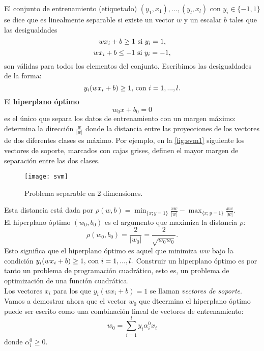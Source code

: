 El conjunto de entrenamiento (etiquetado) $(y_1,x_1),...,(y_l,x_l)$ con $y_i \in \lbrace -1,1 \rbrace$ se dice que es linealmente separable si existe un vector $w$ y un escalar $b$ tales que las desigualdades
\[ wx_i+b \geq 1 \textnormal{ si } y_i=1, \]
\[ wx_i+b \leq -1 \textnormal{ si } y_i=-1, \]
son válidas para todos los elementos del conjunto. Escribimos las desigualdades de la forma:
\[ y_i(wx_i+b) \geq 1 \textnormal{, con } i=1,...,l. \]
El \textbf{hiperplano óptimo} 
\[ w_0x+b_0=0 \]
es el único que separa los datos de entrenamiento con un margen máximo: determina la dirección $\frac{w}{\vert w \vert}$ donde la distancia entre las proyecciones de los vectores de dos diferentes clases es máximo. Por ejemplo, en la \autoref{fig:svm1} siguiente los vectores de soporte, marcados con cajas grises, definen el mayor margen de separación entre las dos clases.
\begin{figure}[H]
  \centering
  \texttt{[image: svm]}
  \caption{Problema separable en 2 dimensiones.\cite{cortes1995support}}
  \label{fig:svm1}
\end{figure}
\begin{center}
\end{center}
Esta distancia está dada por $\rho(w,b)=\min_{\lbrace x;y=1 \rbrace} \frac{xw}{\vert w \vert} - \max_{\lbrace x;y=1 \rbrace} \frac{xw}{\vert w \vert}$.\\
El hiperplano óptimo $(w_0,b_0)$ es el argumento que maximiza la distancia $\rho$:
\[ \rho(w_0,b_0)=\frac{2}{\vert w_0 \vert}=\frac{2}{\sqrt{w_0w_0}}. \]
Esto significa que el hiperplano óptimo es aquel que minimiza $ww$ bajo la condición $y_i(wx_i+b) \geq 1 \textnormal{, con } i=1,...,l.$ Construir un hiperplano óptimo es por tanto un problema de programación cuadrático, esto es, un problema de optimización de una función cuadrática. \\
Los vectores $x_{i}$ para los que $y_i(wx_i+b)=1$ se llaman \textit{vectores de soporte}. Vamos a demostrar ahora que el vector $w_0$ que dteermina el hiperplano óptimo puede ser escrito como una combinación lineal de vectores de entrenamiento:
\[ w_0= \sum_{i=1}^l y_i \alpha_i^0 x_i \]
donde $\alpha_i^0 \geq 0.$
